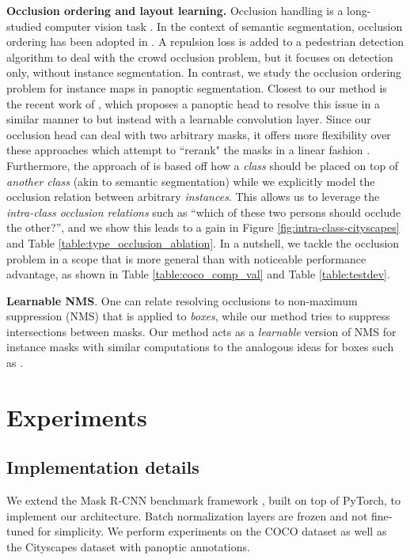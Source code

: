 \documentclass[10pt,twocolumn,letterpaper]{article}
\begin{document}
\noindent \textbf{Occlusion ordering and layout learning.}
Occlusion handling is a long-studied computer vision task \cite{wang2009hog,enzweiler2010multi,sun2005symmetric,hoiem2007recovering}. In the context of semantic segmentation, occlusion ordering has been adopted in \cite{tighe2014scene,Chen_2015_CVPR,zhu2017semantic}. A repulsion loss is added to a pedestrian detection algorithm \cite{wang2018repulsion} to deal with the crowd occlusion problem, but it focuses on detection only, without instance segmentation.
\noindent In contrast, we study the occlusion ordering problem for instance maps in panoptic segmentation. Closest to our method is the recent work of \cite{liu2019end}, which proposes a panoptic head to resolve this issue in a similar manner to \cite{xiong2019upsnet} but instead with a learnable convolution layer. Since our occlusion head can deal with two arbitrary masks, it offers more flexibility over these approaches which attempt to ``rerank" the masks in a linear fashion \cite{xiong2019upsnet, liu2019end}. Furthermore, the approach of \cite{liu2019end} is based off how a \textit{class} should be placed on top of \textit{another class} (akin to semantic segmentation) while we explicitly model the occlusion relation between arbitrary \textit{instances}. This allows us to leverage the \textit{intra-class occlusion relations} such as ``which of these two persons should occlude the other?'', and we show this leads to a gain in Figure \ref{fig:intra-class-cityscapes} and Table \ref{table:type_occlusion_ablation}. In a nutshell, we tackle the occlusion problem in a scope that
is more general than \cite{liu2019end} with noticeable performance advantage, as shown in Table \ref{table:coco_comp_val} and Table \ref{table:testdev}. 

\noindent\textbf{Learnable NMS}. One can relate resolving occlusions to non-maximum suppression (NMS) that is applied to \textit{boxes}, while our method tries to suppress intersections between masks. Our method acts as a \textit{learnable} version of NMS for instance masks with similar computations to the analogous ideas for boxes such as \cite{hosang2017learning}.









\section{Experiments}
\subsection{Implementation details}
We extend the Mask R-CNN benchmark framework \cite{massa2018mrcnn}, built on top of PyTorch, to implement our architecture. Batch normalization \cite{ioffe2015batch} layers are frozen and not fine-tuned for simplicity. We perform experiments on the COCO dataset \cite{lin2014microsoft}  \cite{kirillov2018panoptic} as well as the Cityscapes dataset \cite{Cordts2016Cityscapes} with panoptic annotations. 
\end{document}

